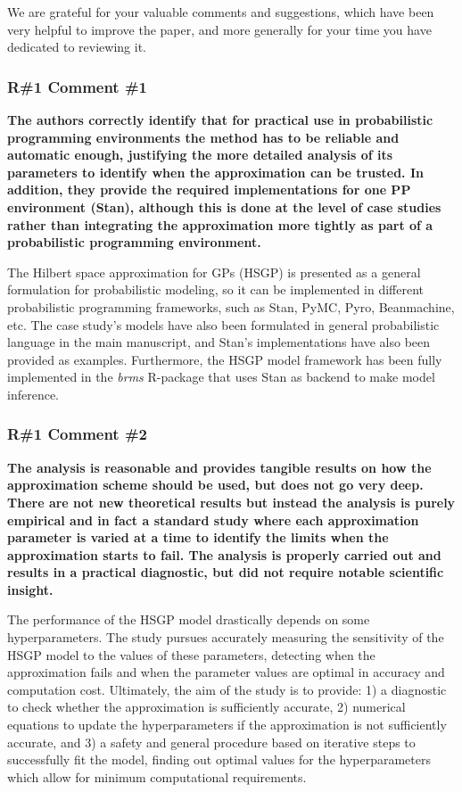 \documentclass[11pt]{report}
\begin{document}
We are grateful for your valuable comments and suggestions, which have been very helpful to improve the paper, and more generally for your time you have dedicated to reviewing it.

\subsubsection*{R\#1 Comment \#1}

\textbf{The authors correctly identify that for practical use in probabilistic programming environments the method has to be reliable and automatic enough, justifying the more detailed analysis of its parameters to identify when the approximation can be trusted. In addition, they provide the required implementations for one PP environment (Stan), although this is done at the level of case studies rather than integrating the approximation more tightly as part of a probabilistic programming environment.}

The Hilbert space approximation for GPs (HSGP) is presented as a general formulation for probabilistic modeling, so it can be implemented in different probabilistic programming frameworks, such as Stan, PyMC, Pyro, Beanmachine, etc. The case study's models have also been formulated in general probabilistic language in the main manuscript, and Stan's implementations have also been provided as examples. Furthermore, the HSGP model framework has been fully implemented in the \textit{brms} R-package that uses Stan as backend to make model inference.

\subsubsection*{R\#1 Comment \#2}

\textbf{The analysis is reasonable and provides tangible results on how the approximation scheme should be used, but does not go very deep. There are not new theoretical results but instead the analysis is purely empirical and in fact a standard study where each approximation parameter is varied at a time to identify the limits when the approximation starts to fail. The analysis is properly carried out and results in a practical diagnostic, but did not require notable scientific insight.}

The performance of the HSGP model drastically depends on some hyperparameters. The study pursues accurately measuring the sensitivity of the HSGP model to the values of these parameters, detecting when the approximation fails and when the parameter values are optimal in accuracy and computation cost. Ultimately, the aim of the study is to provide: 1) a diagnostic to check whether the approximation is sufficiently accurate, 2) numerical equations to update the hyperparameters if the approximation is not sufficiently accurate, and 3) a safety and general procedure based on iterative steps to successfully fit the model, finding out optimal values for the hyperparameters which allow for minimum computational requirements.
\end{document}
